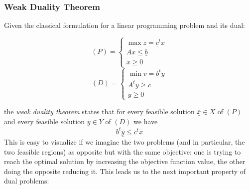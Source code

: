         \subsubsection{Weak Duality Theorem}
            Given the classical formulation for a linear programming problem and its dual:
            \begin{multicols}{2}
                \begin{equation}
                    (P) = 
                    \begin{cases}
                        \max z = \underline{c}^tx \\
                        Ax \leq \underline{b} \\
                        x \geq \underline{0}
                    \end{cases}
                \end{equation}
                \break
                \begin{equation}
                    (D) = 
                    \begin{cases}
                        \min v = \underline{b}^ty \\
                        A^ty \geq \underline{c} \\
                        y \geq \underline{0}
                    \end{cases}
                \end{equation}
            \end{multicols}
            the \textit{weak duality theorem} states that for every feasible solution $\underline{\overline{x}} \in X$ of $(P)$ and every feasible solution $\underline{\overline{y}} \in Y$ of $(D)$ we have
            \begin{equation}
                \underline{b}^t\underline{\overline{y}} \leq \underline{c}^t\underline{\overline{x}}
            \end{equation}
            This is easy to visualize if we imagine the two problems (and in particular, the two feasible regions) as opposite but with the same objective: one is trying to reach the optimal solution by increasing the objective function value, the other doing the opposite reducing it. This leads us to the next important property of dual problems:

